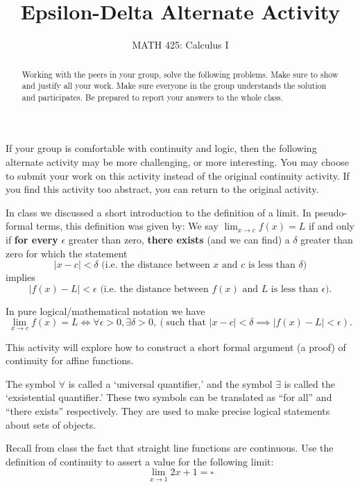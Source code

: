 \documentclass{ximera}
\title{Epsilon-Delta Alternate Activity}
\author{MATH 425: Calculus I}
\begin{document}
\begin{abstract}
   Working with the peers in your group, solve the following problems. Make sure to show and justify all your work. Make sure everyone in the group understands the solution and participates. Be prepared to report your answers to the whole class. 
\end{abstract}
\maketitle

If your group is comfortable with continuity and logic, then the following alternate activity may be more challenging, or more interesting.  You may choose to submit your work on this activity instead of the original continuity activity.  If you find this activity too abstract, you can return to the original activity. \\

\begin{definition}
    In class we discussed a short introduction to the definition of a limit.  In pseudo-formal terms, this definition was given by:
    We say $\lim_{x\rightarrow c}f(x)=L$ if and only if \textbf{for every} $\epsilon$ greater than zero, \textbf{there exists} (and we can find) a $\delta$ greater than zero for which the statement
        \[|x-c|<\delta \text{  (i.e. the distance between $x$ and $c$ is less than $\delta$)}\] 
    implies
        \[|f(x)-L|<\epsilon \text{  (i.e. the distance between $f(x)$ and $L$ is less than $\epsilon$)}.\] 

    In pure logical/mathematical notation we have 
    \[\lim_{x\rightarrow c}f(x)=L \iff \forall \epsilon>0, \exists \delta>0, (\text{such that } |x-c|<\delta \implies |f(x)-L|<\epsilon).\]
\end{definition}

This activity will explore how to construct a short formal argument (a proof) of continuity for affine functions.

\begin{remark}
    The symbol $\forall$ is called a `universal quantifier,' and the symbol $\exists$ is called the `exsistential quantifier.'  These two symbols can be translated as ``for all'' and ``there exists'' respectively.  They are used to make precise logical statements about sets of objects.
\end{remark}

\begin{exercise}
    Recall from class the fact that straight line functions are continuous.  Use the definition of continuity to assert a value for the following limit:
    \[\lim_{x\rightarrow 1}2x+1=\square\]
\end{exercise}
\end{document}
